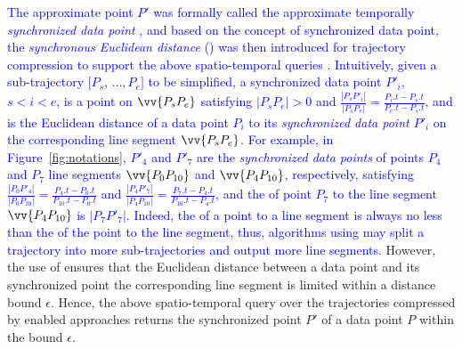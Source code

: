 
\textcolor{blue}{The approximate point $P'$ was formally called the approximate temporally \emph{synchronized data point} \cite{Meratnia:Spatiotemporal}, and based on the concept of synchronized data point, the \emph{synchronous Euclidean distance} (\sed) was then introduced for trajectory compression to support the above spatio-temporal queries \cite{Meratnia:Spatiotemporal}.} 
\textcolor{blue}{Intuitively, given a sub-trajectory $[P_s$, $\ldots, P_e]$ to be simplified, a synchronized data point $P'_i$, $s<i<e$, is a point on $\vv{P_sP_{e}}$ satisfying $|P_sP_e|>0$ and $\frac{|P_sP'_i|}{|P_sP_e|} = \frac{P_i.t - P_s.t}{P_e.t - P_s.t}$, and \sed is the Euclidean distance of a data point $P_i$ to its \emph{synchronized data point $P'_i$} on the corresponding line segment $\vv{P_sP_{e}}$.}
%
\textcolor{blue}{For example, in Figure~\ref{fig:notations}, $P'_4$ and $P'_7$ are the \emph{synchronized data points} of points $P_4$ and $P_7$ \wrt line segments $\vv{P_0P_{10}}$ and $\vv{P_4P_{10}}$, respectively, satisfying $\frac{|P_0P'_4|}{|P_0P_{10}|} = \frac{P_4.t - P_0.t}{P_{10}.t-P_0.t}$ and $\frac{|P_4P'_7|}{|P_4P_{10}|} = \frac{P_7.t - P_4.t}{P_{10}.t-P_4.t}$, and the \sed of point $P_7$ to the line segment $\vv{P_4P_{10}}$ is $|P_7P'_7|$.}
%
\textcolor{blue}{Indeed, the \sed of a point to a line segment is always no less than the \ped of the point to the line segment, thus, \lsa algorithms using \sed may split a trajectory into more sub-trajectories and output more line segments.}
However, the use of \sed ensures that the Euclidean distance between a data point and its synchronized point \wrt the corresponding line segment is limited within a distance bound $\epsilon$. Hence, the above spatio-temporal query over the trajectories compressed by \sed enabled approaches returns the synchronized point $P'$ of a data point $P$ within the bound $\epsilon$.


